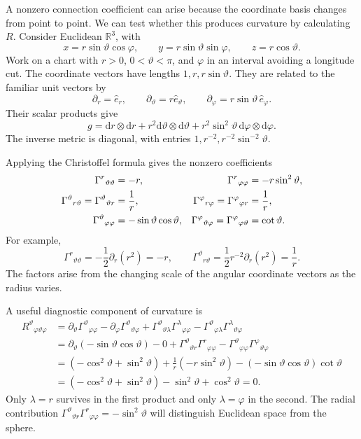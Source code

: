\documentclass[11pt,a4paper]{article}
\numberwithin{equation}{section}
\newcommand{\R}{\mathbb R}
\newcommand{\dd}{\mathrm d}
\begin{document}
A nonzero connection coefficient can arise because the coordinate basis
changes from point to point. We can test whether this produces curvature
by calculating \(R\). Consider Euclidean \(\R^3\), with
\[
 x=r\sin\vartheta\cos\varphi,\qquad
 y=r\sin\vartheta\sin\varphi,\qquad
 z=r\cos\vartheta.
\]
Work on a chart with \(r>0\), \(0<\vartheta<\pi\), and \(\varphi\) in
an interval avoiding a longitude cut. The coordinate vectors have lengths
\(1,r,r\sin\vartheta\). They are related to the familiar unit vectors
by
\[
 \partial_r=\widehat e_r,\qquad
 \partial_\vartheta=r\widehat e_\vartheta,\qquad
 \partial_\varphi=r\sin\vartheta\,\widehat e_\varphi.
\]
Their scalar products give
\begin{equation}
 g=\dd r\otimes\dd r
   +r^2\dd\vartheta\otimes\dd\vartheta
   +r^2\sin^2\vartheta\,\dd\varphi\otimes\dd\varphi.
 \label{gr2:eq-euclidean-spherical-metric}
\end{equation}
The inverse metric is diagonal, with entries
\(1,r^{-2},r^{-2}\sin^{-2}\vartheta\).

Applying the Christoffel formula gives the nonzero coefficients
\begin{align}
 \Gamma^r{}_{\vartheta\vartheta}&=-r,
 &\Gamma^r{}_{\varphi\varphi}&=-r\sin^2\vartheta,\notag\\
 \Gamma^\vartheta{}_{r\vartheta}
 =\Gamma^\vartheta{}_{\vartheta r}&=\frac1r,
 &\Gamma^\varphi{}_{r\varphi}
 =\Gamma^\varphi{}_{\varphi r}&=\frac1r,\notag\\
 \Gamma^\vartheta{}_{\varphi\varphi}&=-\sin\vartheta\cos\vartheta,
 &\Gamma^\varphi{}_{\vartheta\varphi}
 =\Gamma^\varphi{}_{\varphi\vartheta}&=\cot\vartheta.
 \label{gr2:eq-euclidean-spherical-gamma}
\end{align}
For example,
\[
 \Gamma^r{}_{\vartheta\vartheta}
 =-\frac12\partial_r(r^2)=-r,
 \qquad
 \Gamma^\vartheta{}_{r\vartheta}
 =\frac12r^{-2}\partial_r(r^2)=\frac1r.
\]
The factors arise from the changing scale of the angular coordinate
vectors as the radius varies.

A useful diagnostic component of curvature is
\begin{align*}
 R^\vartheta{}_{\varphi\vartheta\varphi}
 &=\partial_\vartheta\Gamma^\vartheta{}_{\varphi\varphi}
   -\partial_\varphi\Gamma^\vartheta{}_{\vartheta\varphi}
   +\Gamma^\vartheta{}_{\vartheta\lambda}
      \Gamma^\lambda{}_{\varphi\varphi}
   -\Gamma^\vartheta{}_{\varphi\lambda}
      \Gamma^\lambda{}_{\vartheta\varphi}\\
 &=\partial_\vartheta(-\sin\vartheta\cos\vartheta)-0
   +\Gamma^\vartheta{}_{\vartheta r}
      \Gamma^r{}_{\varphi\varphi}
   -\Gamma^\vartheta{}_{\varphi\varphi}
      \Gamma^\varphi{}_{\vartheta\varphi}\\
 &=(-\cos^2\vartheta+\sin^2\vartheta)
   +\frac1r(-r\sin^2\vartheta)
   -(-\sin\vartheta\cos\vartheta)\cot\vartheta\\
 &=(-\cos^2\vartheta+\sin^2\vartheta)
   -\sin^2\vartheta+\cos^2\vartheta=0.
\end{align*}
Only \(\lambda=r\) survives in the first product and only
\(\lambda=\varphi\) in the second. The radial contribution
\(\Gamma^\vartheta{}_{\vartheta r}\Gamma^r{}_{\varphi\varphi}
=-\sin^2\vartheta\) will distinguish Euclidean space from the sphere.
\end{document}
